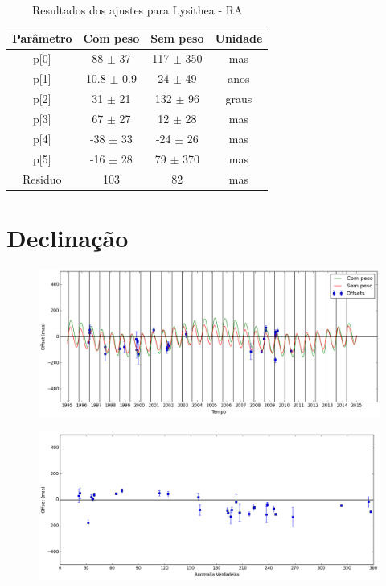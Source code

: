 \documentclass[11pt,a4paper]{report}
\begin{document}
\begin{table}[h!]
\caption{\label{Tab: Lysithea-RA} Resultados dos ajustes para Lysithea - RA}
\begin{centering}
\begin{tabular}{cccc}
\hline
\hline
Parâmetro & Com peso & Sem peso & Unidade\tabularnewline
\hline
p[0] & 88 $\pm$ 37 & 117 $\pm$ 350 & mas\\
p[1] & 10.8 $\pm$ 0.9 & 24 $\pm$ 49 & anos\\
p[2] & 31 $\pm$ 21 & 132 $\pm$ 96 & graus\\
p[3] & 67 $\pm$ 27 & 12 $\pm$ 28 & mas\\
p[4] & -38 $\pm$ 33 & -24 $\pm$ 26 & mas\\
p[5] & -16 $\pm$ 28 & 79 $\pm$ 370 & mas\\
Residuo & 103 & 82 & mas\\
\hline 
\end{tabular} 
\par\end{centering}
\end{table}

\section*{Declinação}

\begin{figure}[h]
\includegraphics[scale=0.45]{Lysithea/DEC.png} 
\end{figure}

\begin{figure}[h]
\includegraphics[scale=0.45]{Lysithea/DEC_anom.png}  
\end{figure}
\end{document}
